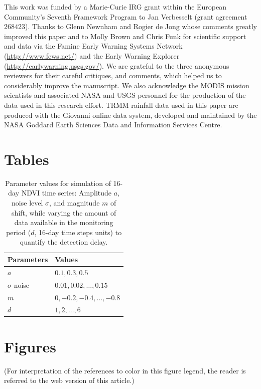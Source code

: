 \documentclass[authoryear,preprint,review,10pt]{elsarticle}
\begin{document}
This work was funded by a Marie-Curie IRG grant within the European Community's Seventh Framework Program to Jan Verbesselt (grant agreement $268423$). Thanks to Glenn Newnham and Rogier de Jong whose comments greatly improved this paper and to Molly Brown and Chris Funk for scientific support and data via the Famine Early Warning Systems Network (\url{http://www.fews.net/}) and the Early Warning Explorer (\url{http://earlywarning.usgs.gov/}). We are grateful to the three anonymous reviewers for their careful critiques, and comments, which helped us to considerably improve the manuscript. We also acknowledge the MODIS mission scientists and associated NASA and USGS personnel for the production of the data used in this research effort. TRMM rainfall data used in this paper are produced with the Giovanni online data system, developed and maintained by the NASA Goddard Earth Sciences Data and Information Services Centre.



\newpage

\section*{Tables}

\begin{table}[htb]
\caption{Parameter values for simulation of 16-day NDVI time series: Amplitude $a$, noise level $\sigma$, and magnitude $m$ of shift,
while varying the amount of data available in the monitoring period ($d$, 16-day time steps units) to quantify the detection delay.}
\centering
\begin{tabular}{ll}
  \hline
  Parameters & Values \\ [0.5ex]
  \hline
  $a$         & $0.1, 0.3, 0.5$ \\
  $\sigma$ noise    & $0.01,0.02,\dots,0.15$ \\
  $m$         & $0, -0.2, -0.4, \dots, -0.8$ \\
  $d$   & $1, 2, \dots, 6$ \\ [.5ex]
  \hline
\end{tabular}
\label{table:simpar}
\end{table}

\newpage

\section*{Figures}

(For interpretation of the references to color in this figure legend, the reader is referred to the web
version of this article.)
\end{document}
